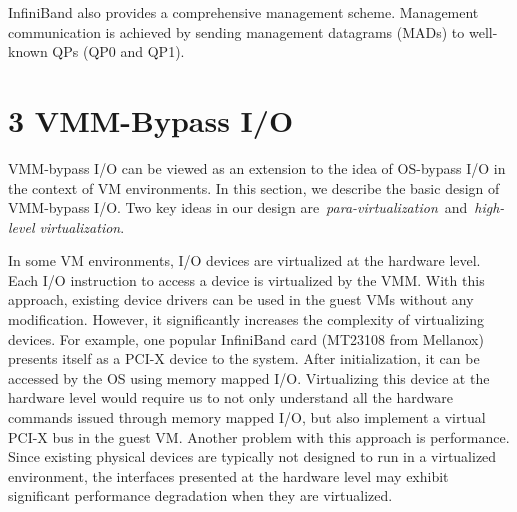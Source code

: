 \documentclass[12pt]{article}
\begin{document}
{\fontsize{13pt}{15.6pt}\selectfont InfiniBand also provides a comprehensive management scheme. Management communication is achieved by sending management datagrams (MADs) to well-known QPs (QP0 and QP1).\par}\par

\section*{3 VMM-Bypass I/O}
\setlength{\parskip}{5.04pt}
{\fontsize{13pt}{15.6pt}\selectfont VMM-bypass I/O can be viewed as an extension to the idea of OS-bypass I/O in the context of VM environments. In this section, we describe the basic design of VMM-bypass I/O. Two key ideas in our design are \textit{para-virtualization} and \textit{high-level virtualization}.\par}\par

{\fontsize{13pt}{15.6pt}\selectfont In some VM environments, I/O devices are virtualized at the hardware level. Each I/O instruction to access a device is virtualized by the VMM. With this approach, existing device drivers can be used in the guest VMs without any modification. However, it significantly increases the complexity of virtualizing devices. For example, one popular InfiniBand card (MT23108 from Mellanox) presents itself as a PCI-X device to the system. After initialization, it can be accessed by the OS using memory mapped I/O. Virtualizing this device at the hardware level would require us to not only understand all the hardware commands issued through memory mapped I/O, but also implement a virtual PCI-X bus in the guest VM. Another problem with this approach is performance. Since existing physical devices are typically not designed to run in a virtualized environment, the interfaces presented at the hardware level may exhibit significant performance degradation when they are virtualized.\par}\par
\end{document}
